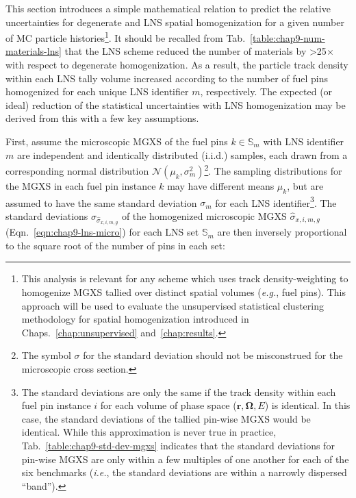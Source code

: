 This section introduces a simple mathematical relation to predict the relative uncertainties for degenerate and \ac{LNS} spatial homogenization for a given number of \ac{MC} particle histories\footnote{This analysis is relevant for any scheme which uses track density-weighting to homogenize \ac{MGXS} tallied over distinct spatial volumes (\textit{e.g.}, fuel pins). This approach will be used to evaluate the unsupervised statistical clustering methodology for spatial homogenization introduced in Chaps.~\ref{chap:unsupervised} and~\ref{chap:results}.}. It should be recalled from Tab.~\ref{table:chap9-num-materials-lns} that the \ac{LNS} scheme reduced the number of materials by >25$\times$ with respect to degenerate homogenization. As a result, the particle track density within each \ac{LNS} tally volume increased according to the number of fuel pins homogenized for each unique \ac{LNS} identifier $m$, respectively. The expected (or ideal) reduction of the statistical uncertainties with \ac{LNS} homogenization may be derived from this with a few key assumptions. 

First, assume the microscopic \ac{MGXS} of the fuel pins $k \in \mathbb{S}_{m}$ with \ac{LNS} identifier $m$ are independent and identically distributed (i.i.d.) samples, each drawn from a corresponding normal distribution $\mathcal{N}(\mu_{k}, \sigma_{m}^2)$\footnote{The symbol $\sigma$ for the standard deviation should not be misconstrued for the microscopic cross section.}. The sampling distributions for the \ac{MGXS} in each fuel pin instance $k$ may have different means $\mu_{k}$, but are assumed to have the same standard deviation $\sigma_{m}$ for each \ac{LNS} identifier\footnote{The standard deviations are only the same if the track density within each fuel pin instance $i$ for each volume of phase space ($\mathbf{r},\mathbf{\Omega},E$) is identical. In this case, the standard deviations of the tallied pin-wise \ac{MGXS} would be identical. While this approximation is never true in practice, Tab.~\ref{table:chap9-std-dev-mgxs} indicates that the standard deviations for pin-wise \ac{MGXS} are only within a few multiples of one another for each of the six benchmarks (\textit{i.e.}, the standard deviations are within a narrowly dispersed ``band'').}. The standard deviations $\sigma_{\hat{\sigma}_{x,i,m,g}}$ of the homogenized microscopic \ac{MGXS} $\hat{\sigma}_{x,i,m,g}$ (Eqn.~\ref{eqn:chap9-lns-micro}) for each \ac{LNS} set $\mathbb{S}_{m}$ are then inversely proportional to the square root of the number of pins in each set:

